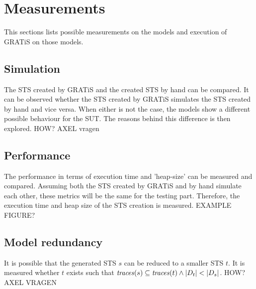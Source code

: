 \section{Measurements}\label{sec:measurements}

This sections lists possible measurements on the models and execution of GRATiS on those models.

\subsection{Simulation}
The STS created by GRATiS and the created STS by hand can be compared. It can be observed whether the STS created by GRATiS simulates the STS created by hand and vice versa. When either is not the case, the models show a different possible behaviour for the SUT. The reasons behind this difference is then explored. HOW? AXEL vragen

\subsection{Performance}
The performance in terms of execution time and 'heap-size' can be measured and compared. Assuming both the STS created by GRATiS and by hand simulate each other, these metrics will be the same for the testing part. Therefore, the execution time and heap size of the STS creation is measured. EXAMPLE FIGURE?


\subsection{Model redundancy}
It is possible that the generated STS $s$ can be reduced to a smaller STS $t$. It is measured whether $t$ exists such that $\mathit{traces}(s) \subseteq \mathit{traces}(t) \land |D_t| < |D_s|$. HOW? AXEL VRAGEN

